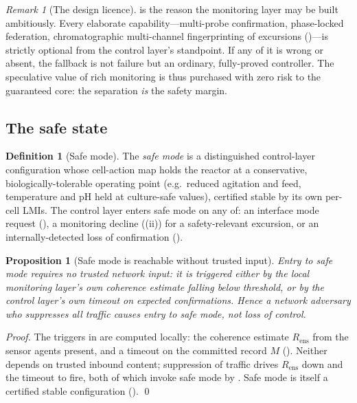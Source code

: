 \documentclass[11pt,a4paper,twocolumn]{article}
\theoremstyle{thmstyle}
\newtheorem{proposition}[theorem]{Proposition}
\theoremstyle{definition}
\newtheorem{definition}[theorem]{Definition}
\theoremstyle{remark}
\newtheorem{remark}[theorem]{Remark}
\newcommand{\Rens}{R_{\mathrm{ens}}}
\begin{document}
\begin{remark}[The design licence]
\label{rem:licence}
 is the reason the monitoring layer may be built
ambitiously. Every elaborate capability---multi-probe confirmation,
phase-locked federation, chromatographic multi-channel fingerprinting of
excursions ()---is strictly optional from the
control layer's standpoint. If any of it is wrong or absent, the fallback
is not failure but an ordinary, fully-proved controller. The speculative
value of rich monitoring is thus purchased with zero risk to the
guaranteed core: the separation \emph{is} the safety margin.
\end{remark}

\subsection{The safe state}

\begin{definition}[Safe mode]
\label{def:safemode}
The \emph{safe mode} is a distinguished control-layer configuration whose
cell-action map holds the reactor at a conservative, biologically-tolerable
operating point (e.g.\ reduced agitation and feed, temperature and pH held
at culture-safe values), certified stable by its own per-cell LMIs. The
control layer enters safe mode on any of: an interface mode request
(), a monitoring decline ((ii)) for
a safety-relevant excursion, or an internally-detected loss of
confirmation ().
\end{definition}

\begin{proposition}[Safe mode is reachable without trusted input]
\label{prop:safe-reachable}
Entry to safe mode requires no trusted network input: it is triggered
either by the local monitoring layer's own coherence estimate falling
below threshold, or by the control layer's own timeout on expected
confirmations. Hence a network adversary who suppresses all traffic
causes entry to safe mode, not loss of control.
\end{proposition}

\begin{proof}
The triggers in  are computed locally: the coherence
estimate $\Rens$ from the sensor agents present, and a timeout on the
committed record $M$ (). Neither depends on trusted
inbound content; suppression of traffic drives $\Rens$ down and the
timeout to fire, both of which invoke safe mode by .
Safe mode is itself a certified stable configuration
(). \qed
\end{proof}
\end{document}
